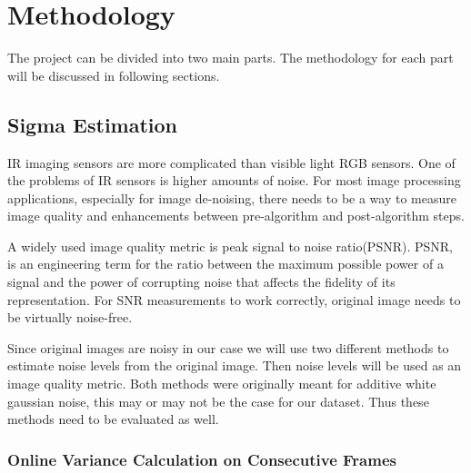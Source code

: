 \documentclass[10pt,twocolumn,letterpaper]{article}
\begin{document}
\section{Methodology}
The project can be divided into two main parts. The methodology for each part will be discussed in following sections.

\subsection{Sigma Estimation}
IR imaging sensors are more complicated than visible light RGB sensors. One of the problems of IR sensors is higher amounts of noise.
For most image processing applications, especially for image de-noising, there needs to be a way to measure image quality and enhancements between pre-algorithm and post-algorithm steps.

A widely used image quality metric is peak signal to noise ratio(PSNR). PSNR, is an engineering term for the ratio between the maximum possible power of a signal and the power of corrupting noise that affects the fidelity of its representation\cite{psnr-wiki}. For SNR measurements to work correctly, original image needs to be virtually noise-free.

Since original images are noisy in our case we will use two different methods to estimate noise levels from the original image. Then noise levels will be used as an image quality metric. Both methods were originally meant for additive white gaussian noise, this may or may not be the case for our dataset. Thus these methods need to be evaluated as well.
\subsubsection{Online Variance Calculation on Consecutive Frames}
\end{document}
